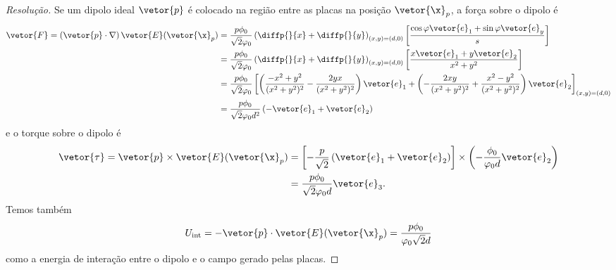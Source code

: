 \begin{proof}[Resolução]
    Se um dipolo ideal \(\vetor{p}\) é colocado na região entre as placas na posição \(\vetor{\x}_p\), a força sobre o dipolo é
    \begin{align*}
        \vetor{F} = \left(\vetor{p}\cdot \nabla\right)\vetor{E}(\vetor{\x}_p)
        &= \frac{p\phi_0}{\sqrt{2}\varphi_0}\left(\diffp{}{x} + \diffp{}{y}\right)_{(x,y) = (d,0)}\left[\frac{\cos\varphi \vetor{e}_1 + \sin\varphi\vetor{e}_y}{s}\right]\\
        &=\frac{p\phi_0}{\sqrt{2}\varphi_0}\left(\diffp{}{x} + \diffp{}{y}\right)_{(x,y)=(d,0)}\left[\frac{x \vetor{e}_1 + y \vetor{e}_2}{x^2 + y^2}\right]\\
        &=  \frac{p \phi_0}{\sqrt{2}\varphi_0} \left[\left(\frac{-x^2 + y^2}{(x^2 + y^2)^2} - \frac{2yx}{(x^2 + y^2)^2}\right)\vetor{e}_1 + \left(- \frac{2xy}{(x^2 + y^2)^2} + \frac{x^2 - y^2}{(x^2 + y^2)^2}\right)\vetor{e}_2\right]_{(x,y) = (d,0)}\\
        &=  \frac{p \phi_0}{\sqrt{2} \varphi_0d^2}\left(-\vetor{e}_1 + \vetor{e}_2\right)
    \end{align*}
    e o torque sobre o dipolo é
    \begin{align*}
        \vetor{\tau} = \vetor{p} \times \vetor{E}(\vetor{\x}_p) &= \left[-\frac{p}{\sqrt{2}}\left(\vetor{e}_1 + \vetor{e}_2\right)\right] \times \left(-\frac{\phi_0}{\varphi_0 d}\vetor{e}_2\right)\\
                                                                &= \frac{p\phi_0}{\sqrt{2} \varphi_0 d}\vetor{e}_3.
    \end{align*}
    Temos também
    \begin{equation*}
        U_\mathrm{int} = - \vetor{p} \cdot \vetor{E}(\vetor{\x}_p) = \frac{p\phi_0}{\varphi_0\sqrt{2}d}
    \end{equation*}
    como a energia de interação entre o dipolo e o campo gerado pelas placas.
\end{proof}
